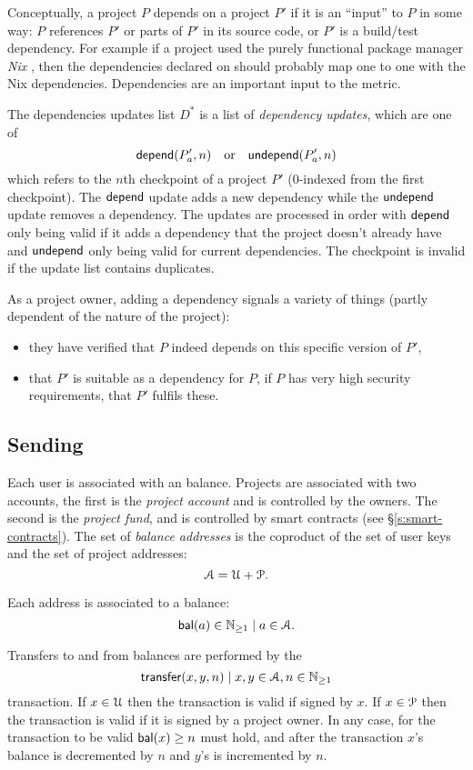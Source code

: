 \label{s:dependencies}
Conceptually, a project $P$ depends on a project $P'$ if it is an
``input'' to $P$ in some way: $P$ references $P'$ or parts of
$P'$ in its source code, or $P'$ is a build/test dependency.
For example if a project used the purely functional package
manager \emph{Nix} \cite{nix}, then the dependencies declared on
\oscoin{} should probably map one to one with the Nix
dependencies. Dependencies are an important input to the \osrank{}
metric.

The dependencies updates list $D^*$ is a list of \emph{dependency
  updates}, which are one of
\[
    \mathsf{depend}(P'_a, n) \quad \text{or} \quad \mathsf{undepend}(P'_a, n)
\]
which refers to the $n$th checkpoint of a project $P'$ ($0$-indexed
from the first checkpoint). The $\mathsf{depend}$ update adds a new dependency
while the $\mathsf{undepend}$ update removes a dependency. The updates are
processed in order with $\mathsf{depend}$ only being valid if it adds a
dependency that the project doesn't already have and $\mathsf{undepend}$
only being valid for current dependencies. The checkpoint is invalid
if the update list contains duplicates.

As a project owner, adding a dependency signals a variety of things
(partly dependent of the nature of the project):
\begin{itemize}
\item they have verified that $P$ indeed depends on this specific
  version of $P'$,
\item that $P'$ is suitable as a dependency for $P$, \eg{} if $P$ has
  very high security requirements, that $P'$ fulfils these.
\end{itemize}

\def\posnat{\mathbb{N}_{\geq 1}}

\subsection{Sending \oscoin{}}
\label{s:sending}

Each user is associated with an \oscoin{} balance. Projects are associated with
two accounts, the first is the \emph{project account} and is controlled by the
owners. The second is the \emph{project fund}, and is controlled by smart
contracts (see \S \ref{s:smart-contracts}). The set of \emph{balance addresses}
is the coproduct of the set of user keys and the set of project addresses:
\[
    \mathcal{A} = \mathcal{U} + \mathcal{P}.
\]

Each address is associated to a balance:
\[
    \bal(a) \in \posnat \mid a \in \accAddrs.
\]

Transfers to and from balances are performed by the
\[
    \tx{transfer}{x,y,n} \mid x,y \in \accAddrs, n \in \posnat
\]
transaction. If $x \in \mathcal{U}$ then the transaction is valid if signed by
$x$. If $x \in \mathcal{P}$ then the transaction is valid if it is signed by a
project owner. In any case, for the transaction to be valid $\mathsf{bal}(x) \geq n$
must hold, and after the transaction $x$'s balance is decremented by $n$ and
$y$'s is incremented by $n$.

